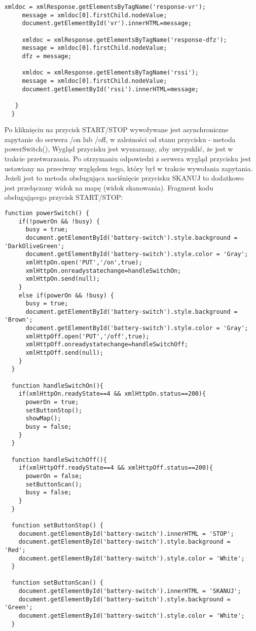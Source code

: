 \documentclass[a4paper,12pt,twoside,openany]{report}
\begin{document}
\begin{lstlisting}[style=customhtml]
     xmldoc = xmlResponse.getElementsByTagName('response-vr');
     message = xmldoc[0].firstChild.nodeValue;
     document.getElementById('vr').innerHTML=message;
	 
	 xmldoc = xmlResponse.getElementsByTagName('response-dfz');
     message = xmldoc[0].firstChild.nodeValue;
     dfz = message;

     xmldoc = xmlResponse.getElementsByTagName('rssi');
     message = xmldoc[0].firstChild.nodeValue;
     document.getElementById('rssi').innerHTML=message;
  
   }
  }
\end{lstlisting}
Po kliknięciu na przycisk START/STOP wywoływane jest asynchroniczne zapytanie do serwera /on lub /off, w zależności od stanu przycisku - metoda powerSwitch(), Wygląd przycisku jest wyszarzany, aby uwypuklić, że jest w trakcie przetwarzania. Po otrzymaniu odpowiedzi z serwera wygląd przycisku jest ustawiany na przeciwny względem tego, który był w trakcie wywołania zapytania. Jeżeli jest to metoda obsługująca naciśnięcie przycisku SKANUJ to dodatkowo jest przełączany widok na mapę (widok skanowania). Fragment kodu obsługującego przycisk START/STOP:
\begin{lstlisting}[style=customhtml]
  function powerSwitch() {
    if(!powerOn && !busy) {
      busy = true;
      document.getElementById('battery-switch').style.background = 'DarkOliveGreen';
      document.getElementById('battery-switch').style.color = 'Gray';
      xmlHttpOn.open('PUT','/on',true);
      xmlHttpOn.onreadystatechange=handleSwitchOn;
      xmlHttpOn.send(null);
    }
    else if(powerOn && !busy) {
      busy = true;
      document.getElementById('battery-switch').style.background = 'Brown';
      document.getElementById('battery-switch').style.color = 'Gray';
      xmlHttpOff.open('PUT','/off',true);
      xmlHttpOff.onreadystatechange=handleSwitchOff;
      xmlHttpOff.send(null);
    }
  }
  
  function handleSwitchOn(){
    if(xmlHttpOn.readyState==4 && xmlHttpOn.status==200){
      powerOn = true;
      setButtonStop();
	  showMap();
      busy = false;
    }
  }

  function handleSwitchOff(){
    if(xmlHttpOff.readyState==4 && xmlHttpOff.status==200){
      powerOn = false;
      setButtonScan();
      busy = false;
    }
  }
  
  function setButtonStop() {
	document.getElementById('battery-switch').innerHTML = 'STOP';
    document.getElementById('battery-switch').style.background = 'Red';
    document.getElementById('battery-switch').style.color = 'White';
  }
  
  function setButtonScan() {
	document.getElementById('battery-switch').innerHTML = 'SKANUJ';
	document.getElementById('battery-switch').style.background = 'Green';
	document.getElementById('battery-switch').style.color = 'White';
  }
\end{lstlisting}
\end{document}
